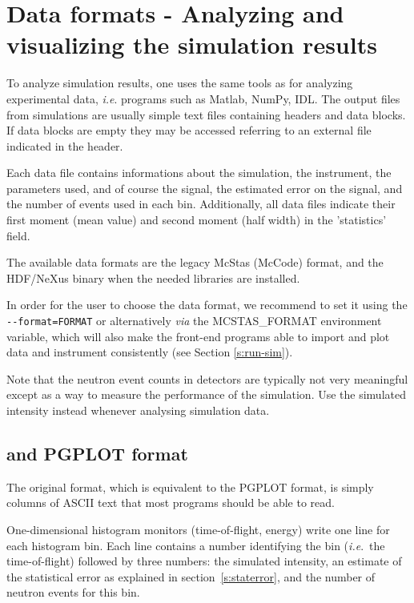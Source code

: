 \section{Data formats - Analyzing and visualizing the simulation results}
\label{s:analyze}

To analyze simulation results, one uses the same tools as for analyzing
experimental data, \textit{i.e}. programs such as Matlab, NumPy, IDL.  The
output files from simulations are usually simple text files containing headers
and data blocks. If data blocks are empty they may be accessed referring to an
external file indicated in the header.

Each data file contains informations about the simulation, the instrument, the
parameters used, and of course the signal, the estimated error on the signal,
and the number of events used in each bin. Additionally, all data files indicate
their first moment (mean value) and second moment (half width) in the
'statistics' field.

The available data formats are the legacy McStas (McCode) format, and the HDF/NeXus binary when the needed libraries are installed. 

In order for the user to choose the data format, we recommend to set it using
the \verb+--format=FORMAT+ or alternatively {\it via} the MCSTAS\_FORMAT
environment variable, which will also make the front-end programs able to import
and plot data and instrument consistently (see Section \ref{s:run-sim}). 

Note that the neutron event counts in detectors are typically not very
meaningful except as a way to measure the performance of the
simulation. Use the simulated intensity instead whenever analysing
simulation data.

\subsection{\MCS and PGPLOT format}
  The \MCS original format, which is
equivalent to the PGPLOT format, is simply columns of ASCII text that most
programs should be able to read.

One-dimensional histogram monitors (time-of-flight, energy)
write one line for each histogram bin. Each line contains a number
identifying the bin (\textit{i.e}.\ the time-of-flight) followed by
three numbers: the simulated intensity, an estimate of the statistical
error as explained in section~\ref{s:staterror}, and the number of
neutron events for this bin.

